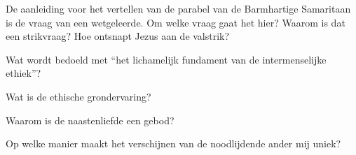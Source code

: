 \documentclass[main.tex]{subfiles}
\begin{document}
\begin{examenvraag}
    \begin{vraag}
        De aanleiding voor het vertellen van de parabel van de Barmhartige Samaritaan is de vraag van een wetgeleerde. Om welke vraag gaat het hier? Waarom is dat een strikvraag? Hoe ontsnapt Jezus aan de valstrik?
    \end{vraag}

    \begin{antwoord}
    \end{antwoord}
\end{examenvraag}


\begin{examenvraag}
    \begin{vraag}
        Wat wordt bedoeld met “het lichamelijk fundament van de intermenselijke ethiek”?
    \end{vraag}

    \begin{antwoord}
    \end{antwoord}
\end{examenvraag}


\begin{examenvraag}
    \begin{vraag}
        Wat is de ethische grondervaring?
    \end{vraag}

    \begin{antwoord}
    \end{antwoord}
\end{examenvraag}


\begin{examenvraag}
    \begin{vraag}
        Waarom is de naastenliefde een gebod?
    \end{vraag}

    \begin{antwoord}
    \end{antwoord}
\end{examenvraag}


\begin{examenvraag}
    \begin{vraag}
        Op welke manier maakt het verschijnen van de noodlijdende ander mij uniek?
    \end{vraag}

    \begin{antwoord}
    \end{antwoord}
\end{examenvraag}
\end{document}
